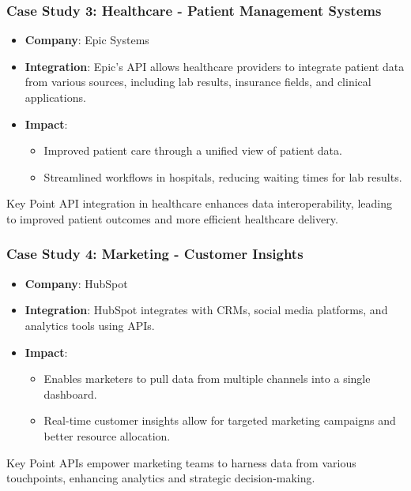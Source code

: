 \documentclass[aspectratio=169]{beamer}
\begin{document}
\begin{frame}[fragile]
    \frametitle{Case Study 3: Healthcare - Patient Management Systems}
    \begin{itemize}
        \item \textbf{Company}: Epic Systems
        \item \textbf{Integration}: Epic’s API allows healthcare providers to integrate patient data from various sources, including lab results, insurance fields, and clinical applications.
        \item \textbf{Impact}:
        \begin{itemize}
            \item Improved patient care through a unified view of patient data.
            \item Streamlined workflows in hospitals, reducing waiting times for lab results.
        \end{itemize}
    \end{itemize}
    \begin{block}{Key Point}
        API integration in healthcare enhances data interoperability, leading to improved patient outcomes and more efficient healthcare delivery.
    \end{block}
\end{frame}

\begin{frame}[fragile]
    \frametitle{Case Study 4: Marketing - Customer Insights}
    \begin{itemize}
        \item \textbf{Company}: HubSpot
        \item \textbf{Integration}: HubSpot integrates with CRMs, social media platforms, and analytics tools using APIs.
        \item \textbf{Impact}:
        \begin{itemize}
            \item Enables marketers to pull data from multiple channels into a single dashboard.
            \item Real-time customer insights allow for targeted marketing campaigns and better resource allocation.
        \end{itemize}
    \end{itemize}
    \begin{block}{Key Point}
        APIs empower marketing teams to harness data from various touchpoints, enhancing analytics and strategic decision-making.
    \end{block}
\end{frame}
\end{document}
